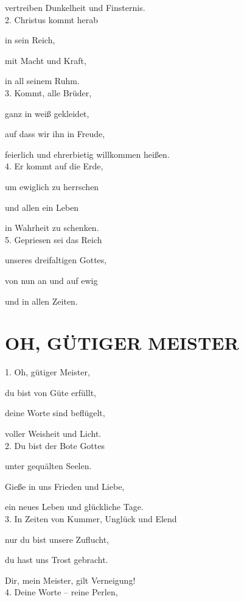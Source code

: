 \documentclass[11pt,a5paper,twoside]{article}
\begin{document}
vertreiben Dunkelheit und Finsternis.\\

2. Christus kommt herab 

in sein Reich, 

mit Macht und Kraft, 

in all seinem Ruhm.\\

3. Kommt, alle Brüder, 

ganz in weiß gekleidet,

auf dass wir ihn in Freude,

feierlich und ehrerbietig willkommen heißen.\\
 
4. Er kommt auf die Erde, 

um ewiglich zu herrschen

und allen ein Leben 

in Wahrheit zu schenken.\\


5. Gepriesen sei das Reich

 unseres dreifaltigen Gottes,
 
 von nun an und auf ewig
 
 und in allen Zeiten.
 
\section[Oh, gütiger Meister]{OH, GÜTIGER MEISTER}

1. Oh, gütiger Meister, 

du bist von Güte erfüllt,

deine Worte sind beflügelt,

voller Weisheit und Licht.\\

2. Du bist der Bote Gottes 

unter gequälten Seelen.

Gieße in uns Frieden und Liebe, 

ein neues Leben und glückliche Tage.\\

3. In Zeiten von Kummer, Unglück und Elend

nur du bist unsere Zuflucht, 
 
du hast uns Trost gebracht.

Dir, mein Meister, gilt Verneigung!\\

4. Deine Worte -- reine Perlen, 
\end{document}

